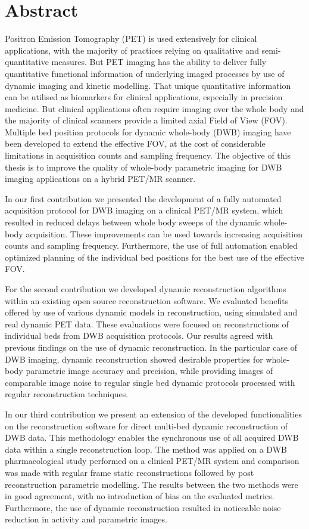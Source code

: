 \section*{Abstract}
Positron Emission Tomography (PET) is used extensively for clinical applications, with the majority of practices relying on qualitative and semi-quantitative measures. But PET imaging has the ability to deliver fully quantitative functional information of underlying imaged processes by use of dynamic imaging and kinetic modelling. That unique quantitative information can be utilised as biomarkers for clinical applications, especially in precision medicine. But clinical applications often require imaging over the whole body and the majority of clinical scanners provide a limited axial Field of View (FOV). Multiple bed position protocols for dynamic whole-body (DWB) imaging have been developed to extend the effective FOV, at the cost of considerable limitations in acquisition counts and sampling frequency. The objective of this thesis is to improve the quality of whole-body parametric imaging for DWB imaging applications on a hybrid PET/MR scanner.

In our first contribution we presented the development of a fully automated acquisition protocol for DWB imaging on a clinical PET/MR system, which resulted in reduced delays between whole body sweeps of the dynamic whole-body acquisition. These improvements can be used towards increasing acquisition counts and sampling frequency. Furthermore, the use of full automation enabled optimized planning of the individual bed positions for the best use of the effective FOV. 

For the second contribution we developed dynamic reconstruction algorithms within an existing open source reconstruction software. We evaluated benefits offered by use of various dynamic models in reconstruction, using simulated and real dynamic PET data. These evaluations were focused on reconstructions of individual beds from DWB acquisition protocols.
Our results agreed with previous findings on the use of dynamic reconstruction. In the particular case of DWB imaging, dynamic reconstruction showed desirable properties for whole-body parametric image accuracy and precision, while providing images of comparable image noise to regular single bed dynamic protocols processed with regular reconstruction techniques.

In our third contribution we present an extension of the developed functionalities on the reconstruction software for direct multi-bed dynamic reconstruction of DWB data. This methodology enables the synchronous use of all acquired DWB data within a single reconstruction loop. The method was applied on a DWB pharmacological study performed on a clinical PET/MR system and comparison was made with regular frame static reconstructions followed by post reconstruction parametric modelling. The results between the two methods were in good agreement, with no introduction of bias on the evaluated metrics. Furthermore, the use of dynamic reconstruction resulted in noticeable noise reduction in activity and parametric images.

